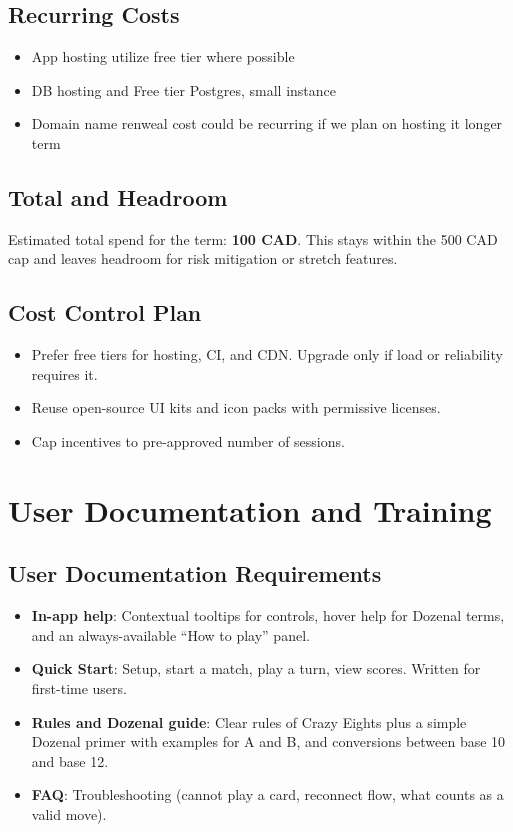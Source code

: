 \documentclass[12pt]{article}
\begin{document}
\subsection{Recurring Costs}
\begin{itemize}
  \item App hosting utilize free tier where possible
  \item DB hosting and Free tier Postgres, small instance
  \item Domain name renweal cost could be recurring if we plan on hosting it longer term
\end{itemize}

\subsection{Total and Headroom}
\noindent Estimated total spend for the term: \textbf{100 CAD}. This stays within the 500 CAD cap and leaves headroom for risk mitigation or stretch features.

\subsection{Cost Control Plan}
\begin{itemize}
  \item Prefer free tiers for hosting, CI, and CDN. Upgrade only if load or reliability requires it.
  \item Reuse open-source UI kits and icon packs with permissive licenses.
  \item Cap incentives to pre-approved number of sessions.
\end{itemize}

\section{User Documentation and Training}


\subsection{User Documentation Requirements}
\begin{itemize}
  \item \textbf{In-app help}: Contextual tooltips for controls, hover help for Dozenal terms, and an always-available ``How to play'' panel.
  \item \textbf{Quick Start}: Setup, start a match, play a turn, view scores. Written for first-time users.
  \item \textbf{Rules and Dozenal guide}: Clear rules of Crazy Eights plus a simple Dozenal primer with examples for A and B, and conversions between base 10 and base 12.
  \item \textbf{FAQ}: Troubleshooting (cannot play a card, reconnect flow, what counts as a valid move).
\end{itemize}
\end{document}
